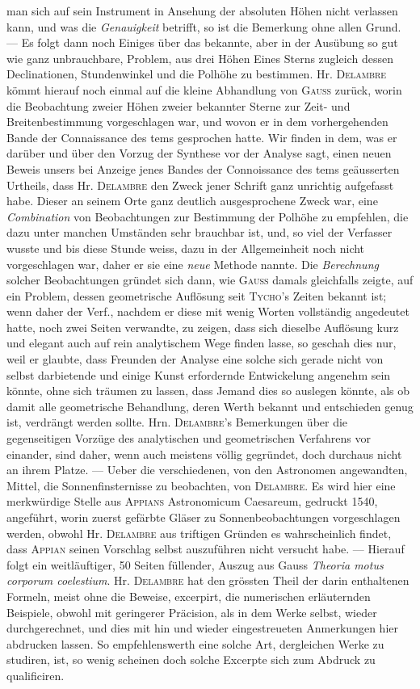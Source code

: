 man sich auf sein Instrument in Ansehung der absoluten Höhen nicht verlassen kann, und was die \emph{Genauigkeit} betrifft, so ist die Bemerkung ohne allen Grund. --- Es folgt dann noch Einiges über das bekannte, aber in der Ausübung so gut wie ganz unbrauchbare, Problem, aus drei Höhen Eines Sterns zugleich dessen Declinationen, Stundenwinkel und die Polhöhe zu bestimmen. Hr. \textsc{Delambre} kömmt hierauf noch einmal auf die kleine Abhandlung von \textsc{Gauss} zurück, worin die Beobachtung zweier Höhen zweier bekannter Sterne zur Zeit- und Breitenbestimmung vorgeschlagen war, und wovon er in dem vorhergehenden Bande der Connaissance des tems gesprochen hatte. Wir finden in dem, was er darüber und über den Vorzug der Synthese vor der Analyse sagt, einen neuen Beweis unsers bei Anzeige jenes Bandes der Connoissance des tems geäusserten Urtheils, dass Hr. \textsc{Delambre} den Zweck jener Schrift ganz unrichtig aufgefasst habe. Dieser an seinem Orte ganz deutlich ausgesprochene Zweck war, eine \emph{Combination} von Beobachtungen zur Bestimmung der Polhöhe zu empfehlen, die dazu unter manchen Umständen sehr brauchbar ist, und, so viel der Verfasser wusste und bis diese Stunde weiss, dazu in der Allgemeinheit noch nicht vorgeschlagen war, daher er sie eine \emph{neue} Methode nannte. Die \emph{Berechnung} solcher Beobachtungen gründet sich dann, wie \textsc{Gauss} damals gleichfalls zeigte, auf ein Problem, dessen geometrische Auflösung seit \textsc{Tycho}'s Zeiten bekannt ist; wenn daher der Verf., nachdem er diese mit wenig Worten vollständig angedeutet hatte, noch zwei Seiten verwandte, zu zeigen, dass sich dieselbe Auflösung kurz und elegant auch auf rein analytischem Wege finden lasse, so geschah dies nur, weil er glaubte, dass Freunden der Analyse eine solche sich gerade nicht von selbst darbietende und einige Kunst erfordernde Entwickelung angenehm sein könnte, ohne sich träumen zu lassen, dass Jemand dies so auslegen könnte, als ob damit alle geometrische Behandlung, deren Werth bekannt und entschieden genug ist, verdrängt werden sollte. Hrn. \textsc{Delambre}'s Bemerkungen über die gegenseitigen Vorzüge des analytischen und geometrischen Verfahrens vor einander, sind daher, wenn auch meistens völlig gegründet, doch durchaus nicht an ihrem Platze. --- Ueber die verschiedenen, von den Astronomen angewandten, Mittel, die Sonnenfinsternisse zu beobachten, von \textsc{Delambre}. Es wird hier eine merkwürdige Stelle aus \textsc{Appians} Astronomicum Caesareum, gedruckt 1540, angeführt, worin zuerst gefärbte Gläser zu Sonnenbeobachtungen vorgeschlagen werden, obwohl Hr. \textsc{Delambre} aus triftigen Gründen es wahrscheinlich findet, dass \textsc{Appian} seinen Vorschlag selbst auszuführen nicht versucht habe. --- Hierauf folgt ein weitläuftiger, 50 Seiten füllender, Auszug aus Gauss \emph{Theoria motus corporum coelestium}. Hr. \textsc{Delambre} hat den grössten Theil der darin enthaltenen Formeln, meist ohne die Beweise, excerpirt, die numerischen erläuternden Beispiele, obwohl mit geringerer Präcision, als in dem Werke selbst, wieder durchgerechnet, und dies mit hin und wieder eingestreueten Anmerkungen hier abdrucken lassen. So empfehlenswerth eine solche Art, dergleichen Werke zu studiren, ist, so wenig scheinen doch solche Excerpte sich zum Abdruck zu qualificiren. 